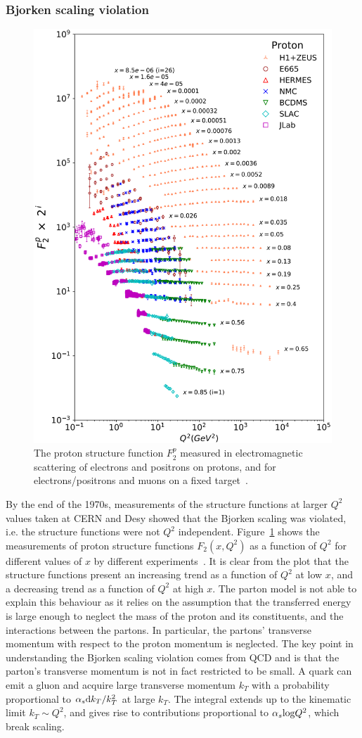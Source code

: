 \subsubsection{Bjorken scaling violation}
\begin{figure}
    \centering
    \includegraphics[width=0.6\linewidth]{Figures/Chapter 2/F2Results.png}
    \caption{The proton structure function $F^p_2$ measured in electromagnetic scattering of electrons and positrons on protons, and for electrons/positrons and muons on a fixed target~\cite{pdg}.}
    \label{fig:scaling_violation}
\end{figure}
By the end of the 1970s, measurements of the structure functions at larger $Q^2$ values taken at CERN and Desy showed that the Bjorken scaling was violated, i.e. the structure functions were not $Q^2$ independent. Figure~\ref{fig:scaling_violation} shows the measurements of proton structure functions $F_2(x,Q^2)$ as a function of $Q^2$ for different values of $x$ by different experiments~\cite{pdg}. It is clear from the plot that the structure functions present an increasing trend as a function of $Q^2$ at low $x$, and a decreasing trend as a function of $Q^2$ at high $x$. The parton model is not able to explain this behaviour as it relies on the assumption that the transferred energy is large enough to neglect the mass of the proton and its constituents, and the interactions between the partons. In particular, the partons' transverse momentum with respect to the proton momentum is neglected. The key point in understanding the Bjorken scaling violation comes from QCD and is that the parton's transverse momentum is not in fact restricted to be small. A quark can emit a gluon and acquire large transverse momentum $k_T$ with a probability proportional to $\alpha_s \mathrm{d} k_T/k_T^2$ at large $k_T$. The integral extends up to the kinematic limit $k_T\sim Q^2$, and gives rise to contributions proportional to $\alpha_s\mathrm{log}Q^2$, which break scaling.

